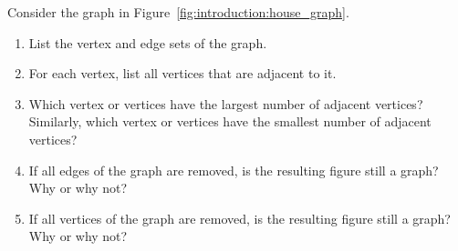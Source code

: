 \begin{example}
\label{eg:introduction:house_graph}
Consider the graph in Figure~\ref{fig:introduction:house_graph}.
%
\begin{enumerate}
\item List the vertex and edge sets of the graph.

\item For each vertex, list all vertices that are adjacent to it.

\item Which vertex or vertices have the largest number of adjacent
  vertices? Similarly, which vertex or vertices have the smallest
  number of adjacent vertices?

\item If all edges of the graph are removed, is the resulting figure
  still a graph? Why or why not?

\item If all vertices of the graph are removed, is the resulting
  figure still a graph? Why or why not?
\end{enumerate}
\end{example}

